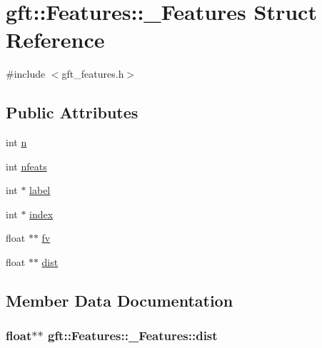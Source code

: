 \hypertarget{structgft_1_1Features_1_1__Features}{}\section{gft\+:\+:Features\+:\+:\+\_\+\+Features Struct Reference}
\label{structgft_1_1Features_1_1__Features}


{\ttfamily \#include $<$gft\+\_\+features.\+h$>$}

\subsection*{Public Attributes}
\begin{DoxyCompactItemize}
\item 
int \hyperlink{structgft_1_1Features_1_1__Features_a7e33bcc52288f62d9f15cd464d9639c6}{n}
\item 
int \hyperlink{structgft_1_1Features_1_1__Features_a12c316ab4f8e2888f20ebd037f93d83c}{nfeats}
\item 
int $\ast$ \hyperlink{structgft_1_1Features_1_1__Features_af33ae34c98987fb0e0ccc9aefc1227ba}{label}
\item 
int $\ast$ \hyperlink{structgft_1_1Features_1_1__Features_ab9a66e0d089f6615b54b267bbb916459}{index}
\item 
float $\ast$$\ast$ \hyperlink{structgft_1_1Features_1_1__Features_ad14a449e33b9782d8b08003037751aa3}{fv}
\item 
float $\ast$$\ast$ \hyperlink{structgft_1_1Features_1_1__Features_aed46d3669694e9ad17fd75edc1956d2b}{dist}
\end{DoxyCompactItemize}


\subsection{Member Data Documentation}
\subsubsection[{\texorpdfstring{dist}{dist}}]{\setlength{\rightskip}{0pt plus 5cm}float$\ast$$\ast$ gft\+::\+Features\+::\+\_\+\+Features\+::dist}\hypertarget{structgft_1_1Features_1_1__Features_aed46d3669694e9ad17fd75edc1956d2b}{}\label{structgft_1_1Features_1_1__Features_aed46d3669694e9ad17fd75edc1956d2b}
